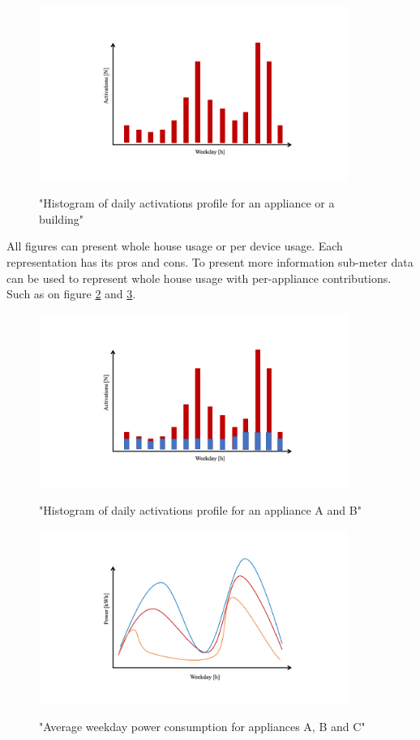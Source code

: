 \begin{figure}[H]
	\centering
	\caption{"Histogram of daily activations profile for an appliance or a building"}
	\includegraphics[width=0.9\textwidth]{Figures/profile_sketches/Slide5.png}
	\label{fig:daily_act_profile}
\end{figure}

All figures can present whole house usage or per device usage. Each representation has its pros and cons. 
To present more information sub-meter data can be used to represent whole house usage with per-appliance contributions.
Such as on figure \ref{fig:daily_act_m_profile} and \ref{fig:daily_power_m_profile}.

\begin{figure}[H]
	\centering
	\caption{"Histogram of daily activations profile for an appliance A and B"}
	\includegraphics[width=0.9\textwidth]{Figures/profile_sketches/Slide8.png}
	\label{fig:daily_act_m_profile}
\end{figure}
\begin{figure}[H]
	\centering
	\caption{"Average weekday power consumption for appliances A, B and C"}
	\includegraphics[width=0.9\textwidth]{Figures/profile_sketches/Slide2.png}
	\label{fig:daily_power_m_profile}
\end{figure}


